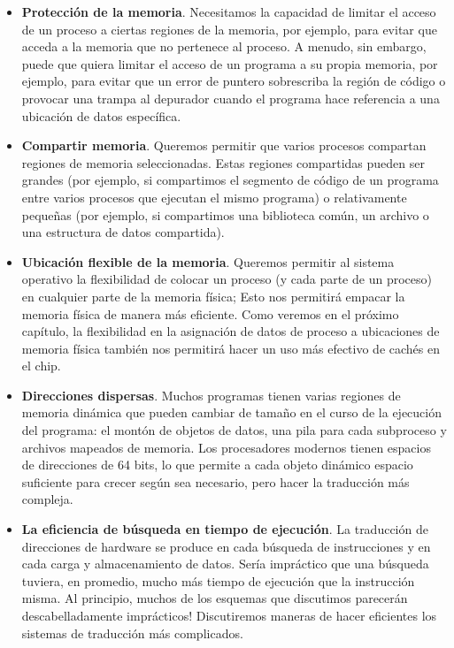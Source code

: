 \documentclass[10pt]{book}
\begin{document}
\begin{itemize}
\item \textbf{Protección de la memoria}. Necesitamos la capacidad de limitar el acceso de un proceso a ciertas regiones de la memoria, por ejemplo, para evitar que acceda a la memoria que no pertenece al proceso. A menudo, sin embargo, puede que quiera limitar el acceso de un programa a su propia memoria, por ejemplo, para evitar que un error de puntero sobrescriba la región de código o provocar una trampa al depurador cuando el programa hace referencia a una ubicación de datos específica.

\item \textbf{Compartir memoria}. Queremos permitir que varios procesos compartan regiones de memoria seleccionadas. Estas regiones compartidas pueden ser grandes (por ejemplo, si compartimos el segmento de código de un programa entre varios procesos que ejecutan el mismo programa) o relativamente pequeñas (por ejemplo, si compartimos una biblioteca común, un archivo o una estructura de datos compartida).

\item \textbf{Ubicación flexible de la memoria}. Queremos permitir al sistema operativo la flexibilidad de colocar un proceso (y cada parte de un proceso) en cualquier parte de la memoria física; Esto nos permitirá empacar la memoria física de manera más eficiente. Como veremos en el próximo capítulo, la flexibilidad en la asignación de datos de proceso a ubicaciones de memoria física también nos permitirá hacer un uso más efectivo de cachés en el chip.

\item \textbf{Direcciones dispersas}. Muchos programas tienen varias regiones de memoria dinámica que pueden cambiar de tamaño en el curso de la ejecución del programa: el montón de objetos de datos, una pila para cada subproceso y archivos mapeados de memoria. Los procesadores modernos tienen espacios de direcciones de 64 bits, lo que permite a cada objeto dinámico espacio suficiente para crecer según sea necesario, pero hacer la traducción más compleja.

\item \textbf{La eficiencia de búsqueda en tiempo de ejecución}. La traducción de direcciones de hardware se produce en cada búsqueda de instrucciones y en cada carga y almacenamiento de datos. Sería impráctico que una búsqueda tuviera, en promedio, mucho más tiempo de ejecución que la instrucción misma. Al principio, muchos de los esquemas que discutimos parecerán descabelladamente imprácticos! Discutiremos maneras de hacer eficientes los sistemas de traducción más complicados.


\end{itemize}
\end{document}
